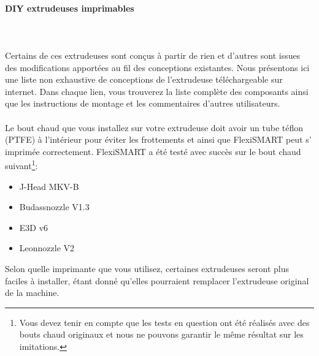 \documentclass[11pt,a4paper]{article}
\begin{document}
			\paragraph{DIY extrudeuses imprimables}\mbox{}\\\\
Certains de ces extrudeuses sont conçus à partir de rien et d’autres sont issues des modifications apportées au fil des conceptions existantes. Nous présentons ici une liste non exhaustive de conceptions de l’extrudeuse téléchargeable sur internet. Dans chaque lien, vous trouverez la liste complète des composants ainsi que les instructions de montage et les commentaires d’autres utilisateurs.
\\\\
Le bout chaud que vous installez sur votre extrudeuse doit avoir un tube téflon (PTFE) à l’intérieur pour éviter les frottements et ainsi que FlexiSMART peut s’ imprimée correctement. FlexiSMART a été testé avec succès sur le bout chaud suivant\footnote{Vous devez tenir en compte que les tests en question ont été réalisés avec des bouts chaud originaux et nous ne pouvons garantir le même résultat sur les imitations.}:
\begin{itemize}
\item J-Head MKV-B
\item Budassnozzle V1.3
\item E3D v6
\item Leonnozzle V2
\end{itemize}
Selon quelle imprimante que vous utilisez, certaines extrudeuses seront plus faciles à installer, étant donné qu’elles pourraient remplacer l’extrudeuse original de la machine.
\end{document}
